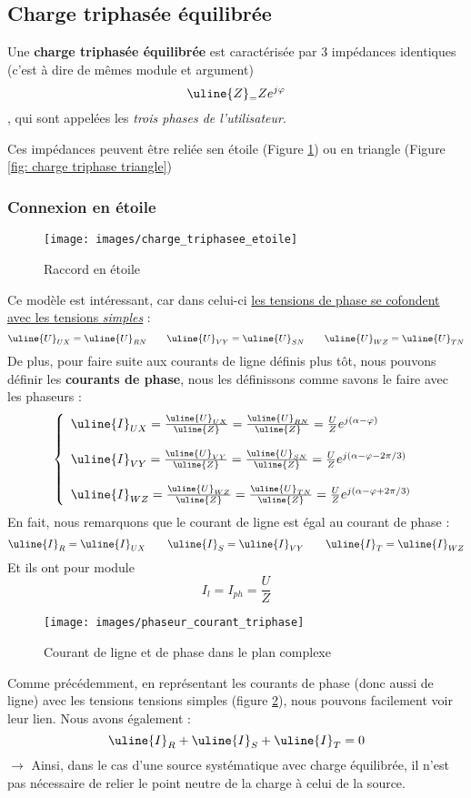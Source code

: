 \documentclass[12pt,a4paper]{article}
\newcommand{\uz}{\uline{Z} }
\newcommand{\ui}{\uline{I} }
\newcommand{\uu}{\uline{U} }
\begin{document}
\subsection{Charge triphasée équilibrée}
Une \textbf{charge triphasée équilibrée} est caractérisée par 3 impédances identiques (c'est à dire de mêmes module et argument) 
\[\uz_ = Ze^{j\varphi}\], qui sont appelées les \textit{trois phases de l'utilisateur}. 

Ces impédances peuvent être reliée sen étoile (Figure \ref{fig: charge triphasee etoile}) ou en triangle (Figure \ref{fig: charge triphase triangle})
\subsubsection{Connexion en étoile}
\begin{figure}
	\centering
	\texttt{[image: images/charge\_triphasee\_etoile]}
	\caption{Raccord en étoile}
	\label{fig: charge triphasee etoile}
\end{figure}
Ce modèle est intéressant, car dans celui-ci \uline{les tensions de phase se cofondent avec les tensions \textit{simples}} :
\begin{equation}
	 \uu_{UX} = \uu_{RN} \qquad \uu_{VY} = \uu_{SN} \qquad \uu_{WZ} = \uu_{TN}	
\end{equation}
De plus, pour faire suite aux courants de ligne définis plus tôt, nous pouvons définir les \textbf{courants de phase}, nous les définissons comme savons le faire avec les phaseurs :
\begin{equation*}
	\left\{\begin{array}{l}
		\ui_{UX} = \frac{\uu_{UX}}{\uz} = \frac{\uu_{RN}}{\uz} = \frac{U}{Z}e^{j(\alpha - \varphi)}\\
		\\		
		\ui_{VY} = \frac{\uu_{VY}}{\uz} = \frac{\uu_{SN}}{\uz} = \frac{U}{Z}e^{j(\alpha - \varphi - 2\pi/3)}\\
		\\		
	\ui_{WZ} = \frac{\uu_{WZ}}{\uz} = \frac{\uu_{TN}}{\uz} = \frac{U}{Z}e^{j(\alpha - \varphi + 2\pi/3)}
\end{array}\right.
\end{equation*}
En fait, nous remarquons que le courant de ligne est égal au courant de phase :
\[\ui_R = \ui_{UX} \qquad \ui_S = \ui_{VY} \qquad \ui_T = \ui_{WZ}\]
Et ils ont pour module
\[I_l = I_{ph} = \frac{U}{Z}\]
\begin{figure}
	\centering
	\texttt{[image: images/phaseur\_courant\_triphase]}
	\caption{Courant de ligne et de phase dans le plan complexe}
	\label{fig: phaseur courant ligne phase}
\end{figure}
Comme précédemment, en représentant les courants de phase (donc aussi de ligne) avec les tensions tensions simples (figure \ref{fig: phaseur courant ligne phase}), nous pouvons facilement voir leur lien. Nous avons également :
\[\ui_R + \ui_S + \ui_T = 0\]
$\to$ Ainsi, dans le cas d'une source systématique avec charge équilibrée, il n'est pas nécessaire de relier le point neutre de la charge à celui de la source.
\end{document}
